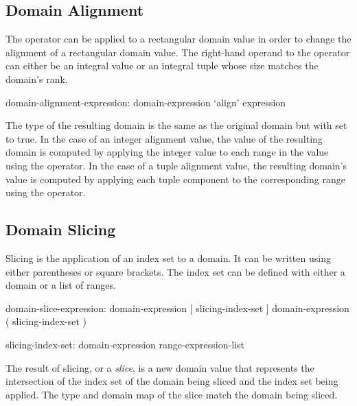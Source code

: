 \subsection{Domain Alignment}
\label{Domain_Alignment}

The  operator can be applied to a rectangular domain value in
order to change the alignment of a rectangular domain value.  The right-hand
operand to the  operator can either be an integral value or
an integral tuple whose size matches the domain's rank.

\begin{syntax}
domain-alignment-expression:
  domain-expression `align' expression
\end{syntax}

The type of the resulting domain is the same as the original domain
but with  set to true.
In the case of an integer alignment value, the value of the resulting
domain is computed by applying the integer value to each range in the
value using the  operator.  In the case of a tuple
alignment value, the resulting domain's value is computed by applying
each tuple component to the corresponding range using the 
operator.


\subsection{Domain Slicing}
\label{Domain_Slicing}

Slicing is the application of an index set to a domain.
It can be written using either parentheses or square brackets.
The index set can be defined with either a domain or a list of ranges.

\begin{syntax}
domain-slice-expression:
  domain-expression [ slicing-index-set ]
  domain-expression ( slicing-index-set )

slicing-index-set:
  domain-expression
  range-expression-list
\end{syntax}

The result of slicing, or a \emph{slice}, is a new domain value
that represents the intersection of
the index set of the domain being sliced and
the index set being applied.
The type and domain map of the slice match the domain being sliced.

